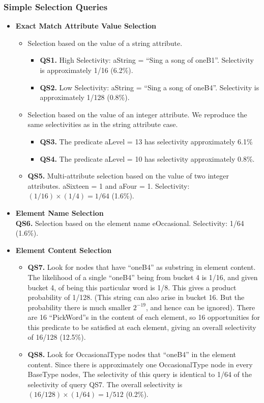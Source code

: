 \subsubsection{Simple Selection Queries}
\begin {itemize}

\item {\bf Exact Match Attribute Value Selection}
\begin{itemize}
\item
Selection based on the value of a string attribute.
\begin{itemize}
\item {\bf QS1.} High Selectivity: {\sf aString = ``Sing a song of oneB1''}.
Selectivity is approximately 1/16 (6.2\%).
\item {\bf QS2.} Low Selectivity: {\sf aString = ``Sing a song of oneB4''}.
Selectivity is approximately 1/128 (0.8\%).
\end{itemize}
\item
Selection based on the value of an integer attribute.  We reproduce
the same selectivities as in the string attribute case.  
\begin{itemize}
\item {\bf QS3.} The predicate
{\sf aLevel = 13} has selectivity approximately 6.1\%
\item {\bf QS4.} The 
predicate {\sf aLevel = 10} has selectivity approximately 0.8\%.
\end{itemize}
\item
{\bf QS5.} Multi-attribute selection based on the value of two integer
attributes. {\sf aSixteen = 1 and aFour = 1}. Selectivity: $(1/16) \times (1/4) = 1/64$ (1.6\%).
\end{itemize}

\item {\bf Element Name Selection} \\
{\bf QS6.} Selection based on the element
name  {\sf eOccasional}. Selectivity: 1/64 (1.6\%).

\item {\bf Element Content Selection}
\begin{itemize}
\item
{\bf QS7.} Look for nodes that have {\sf ``oneB4''} as substring in element 
content.
The likelihood of a single ``oneB4'' being from bucket 4 is 1/16,
and given bucket 4, of being this particular word is 1/8.  This gives
a product probability of 1/128.  (This string can also arise in bucket
16.  But the probability there is much smaller $2^{-19}$, and hence
can be ignored). There are 16 ``PickWord''s in the content of
each element, so 16 opportunities for this predicate to be satisfied at
each element, giving an overall selectivity of 16/128 (12.5\%).
\item
{\bf QS8.} Look for {\sf OccasionalType} nodes that  ``oneB4'' in the element content. 
Since there is approximately one {\sf OccasionalType} node in every {\sf BaseType} nodes, The selectivity of this query is identical to
1/64 of the selectivity of query QS7.  The overall selectivity is $(16/128) \times (1/64) = 1/512$ (0.2\%).
\end{itemize}


\end{itemize}
